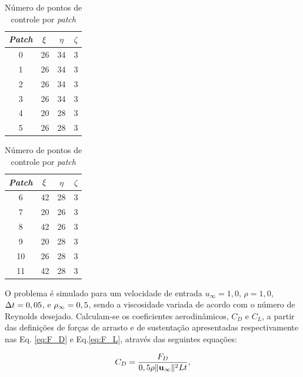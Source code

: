 \documentclass[tese_patricia]{subfiles}
\begin{document}
\begin{table}[h]
	\caption{Número de pontos de controle por \textit{patch}}
	\centering
	\begin{minipage}{0.49\textwidth}
		\centering
		\begin{tabular}{|c | c | c| c|} 
		\hline
		\textit{Patch} & $\xi$ & $\eta$ & $\zeta$\\ 
		\hline
		0 & 26 & 34 & 3\\
		\hline
		1 & 26 & 34 & 3\\
		\hline
		2 & 26 & 34 & 3\\
		\hline
		3 & 26 & 34 & 3\\
		\hline
		4 & 20 & 28 & 3\\
		\hline
		5 & 26 & 28 & 3\\ 
		\hline
		\end{tabular}
	\end{minipage}%
	\hspace{-3cm}  %
	\begin{minipage}{0.49\textwidth}
		\centering
		\begin{tabular}{|c | c | c| c|} 
		\hline
		\textit{Patch} & $\xi$ & $\eta$ & $\zeta$\\ 
		\hline
		6 & 42 & 28 & 3\\
		\hline
		7 & 20 & 26 & 3\\
		\hline
		8 & 42 & 26 & 3\\
		\hline
		9 & 20 & 28 & 3\\
		\hline
		10 & 26 & 28 & 3\\
		\hline
		11 & 42 & 28 & 3\\ 
		\hline
		\end{tabular}
		\label{tab:cilindro_discretização_patches}
	\end{minipage}
\end{table}


O problema é simulado para um velocidade de entrada $u_{\infty} = 1,0$, $\rho = 1,0$, $\Delta t = 0,05$, e $\rho_\infty = 0,5$, sendo a viscosidade variada de acordo com o número de Reynolds desejado.  Calculam-se os coeficientes aerodinâmicos, $C_{D}$ e $C_{L}$, a partir das definições de forças de arrasto e de sustentação apresentadas respectivamente nas Eq. \ref{eq:F_D} e Eq.\ref{eq:F_L}, através das seguintes equações:

\begin{align}
	C_D = \frac{F_D}{0,5\rho \lVert \mathbf{u}_{\infty} \lVert^{2} L t},
\end{align}
\end{document}
